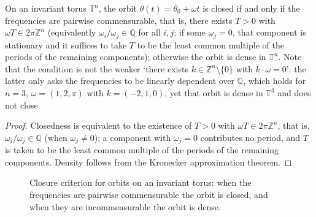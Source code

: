\begin{corollary}\label{cor:periodic_vs_quasiperiodic}
On an invariant torus $\mathbb{T}^n$, the orbit $\theta(t)=\theta_0+\omega t$ is closed if and only if the frequencies are pairwise commensurable, that is, there exists $T>0$ with $\omega T\in2\pi\mathbb{Z}^n$ (equivalently $\omega_i/\omega_j\in\mathbb{Q}$ for all $i,j$; if some $\omega_j=0$, that component is stationary and it suffices to take $T$ to be the least common multiple of the periods of the remaining components); otherwise the orbit is dense in $\mathbb{T}^n$. Note that the condition is not the weaker `there exists $k\in\mathbb{Z}^n\setminus\{0\}$ with $k\cdot\omega=0$': the latter only asks the frequencies to be linearly dependent over $\mathbb{Q}$, which holds for $n=3$, $\omega=(1,2,\pi)$ with $k=(-2,1,0)$, yet that orbit is dense in $\mathbb{T}^3$ and does not close.
\end{corollary}

\begin{proof}
Closedness is equivalent to the existence of $T>0$ with $\omega T\in 2\pi\mathbb{Z}^n$, that is, $\omega_i/\omega_j\in\mathbb{Q}$ (when $\omega_j\ne0$); a component with $\omega_j=0$ contributes no period, and $T$ is taken to be the least common multiple of the periods of the remaining components. Density follows from the Kronecker approximation theorem.
\end{proof}

\begin{figure}[htbp]
\centering
{}
\caption{Closure criterion for orbits on an invariant torus: when the frequencies are pairwise commensurable the orbit is closed, and when they are incommensurable the orbit is dense.}
\label{fig:torus_closure_periodic}
\end{figure}

